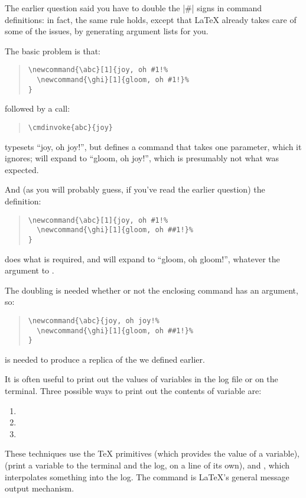 The earlier question said you have to double the |#| signs in command
definitions: in fact, the same rule holds, except that \LaTeX{}
already takes care of some of the issues, by generating argument lists
for you.

The basic problem is that:
\begin{quote}
\begin{verbatim}
\newcommand{\abc}[1]{joy, oh #1!%
  \newcommand{\ghi}[1]{gloom, oh #1!}%
}
\end{verbatim}
\end{quote}
followed by a call:
\begin{quote}
\begin{verbatim}
\cmdinvoke{abc}{joy}
\end{verbatim}
\end{quote}
typesets ``joy, oh joy!'', but defines a command  that takes
one parameter, which it ignores;  will expand to
``gloom, oh joy!'', which is presumably not what was expected.

And (as you will probably guess, if you've read the earlier question)
the definition:
\begin{quote}
\begin{verbatim}
\newcommand{\abc}[1]{joy, oh #1!%
  \newcommand{\ghi}[1]{gloom, oh ##1!}%
}
\end{verbatim}
\end{quote}
does what is required, and  will expand to
``gloom, oh gloom!'', whatever the argument to .

The doubling is needed whether or not the enclosing command has an
argument, so:
\begin{quote}
\begin{verbatim}
\newcommand{\abc}{joy, oh joy!%
  \newcommand{\ghi}[1]{gloom, oh ##1!}%
}
\end{verbatim}
\end{quote}
is needed to produce a replica of the  we defined earlier.


It is often useful to print out the values of variables in the log
file or on the terminal.  Three possible ways to print out the
contents of  variable are:
\begin{enumerate}
\item {}
\item {}
\item {}
\end{enumerate}
These techniques use the \TeX{} primitives  (which provides
the value of a variable),  (print a variable to the
terminal and the log, on a line of its own), and , which
interpolates something into the log.  The command  is
\LaTeX{}'s general message output mechanism.

